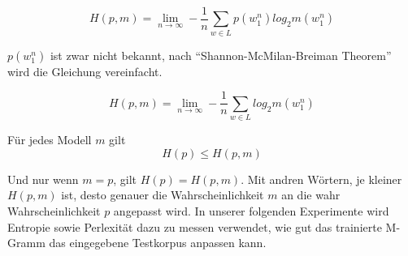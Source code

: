 \begin{equation}
H(p,m)=\lim_{n\to\infty}-\frac{1}{n}\sum_{w\in L}p(w_{1}^{n})log_{2}m(w_{1}^{n})
\end{equation}

$p(w_{1}^{n})$ ist zwar nicht bekannt, nach "`Shannon-McMilan-Breiman Theorem"' wird die Gleichung vereinfacht. 

\begin{equation}
H(p,m)=\lim_{n\to\infty}-\frac{1}{n}\sum_{w\in L}log_{2}m(w_{1}^{n})
\end{equation}

F\"ur jedes Modell $m$ gilt \\
\begin{equation}
H(p)\leq H(p,m)
\end{equation}

Und nur wenn $m=p$, gilt $H(p)=H(p,m)$. Mit andren W\"ortern, je kleiner $H(p,m)$ ist, desto genauer die Wahrscheinlichkeit $m$ an die wahr Wahrscheinlichkeit $p$ angepasst wird.
In unserer folgenden Experimente wird Entropie sowie Perlexit\"at dazu zu messen verwendet, wie gut das trainierte M-Gramm das eingegebene Testkorpus anpassen kann.

